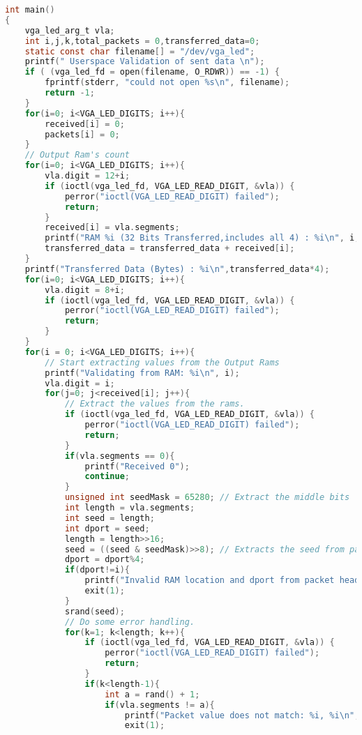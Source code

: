 \documentclass[twoside,12pt,fleqn]{book} %
\begin{document}
\begin{lstlisting}[language=C]
int main()
{
    vga_led_arg_t vla;
    int i,j,k,total_packets = 0,transferred_data=0;
    static const char filename[] = "/dev/vga_led";
    printf(" Userspace Validation of sent data \n");
    if ( (vga_led_fd = open(filename, O_RDWR)) == -1) {
        fprintf(stderr, "could not open %s\n", filename);
        return -1;
    }
    for(i=0; i<VGA_LED_DIGITS; i++){
        received[i] = 0;
        packets[i] = 0;
    }
    // Output Ram's count
    for(i=0; i<VGA_LED_DIGITS; i++){
        vla.digit = 12+i;
        if (ioctl(vga_led_fd, VGA_LED_READ_DIGIT, &vla)) {
            perror("ioctl(VGA_LED_READ_DIGIT) failed");
            return;
        }
        received[i] = vla.segments;
        printf("RAM %i (32 Bits Transferred,includes all 4) : %i\n", i, received[i]);
        transferred_data = transferred_data + received[i];
    }
    printf("Transferred Data (Bytes) : %i\n",transferred_data*4); 
    for(i=0; i<VGA_LED_DIGITS; i++){
        vla.digit = 8+i;
        if (ioctl(vga_led_fd, VGA_LED_READ_DIGIT, &vla)) {
            perror("ioctl(VGA_LED_READ_DIGIT) failed");
            return;
        }
    }
    for(i = 0; i<VGA_LED_DIGITS; i++){
        // Start extracting values from the Output Rams
        printf("Validating from RAM: %i\n", i);
        vla.digit = i;
        for(j=0; j<received[i]; j++){
            // Extract the values from the rams. 
            if (ioctl(vga_led_fd, VGA_LED_READ_DIGIT, &vla)) {
                perror("ioctl(VGA_LED_READ_DIGIT) failed");
                return;
            }
            if(vla.segments == 0){
                printf("Received 0");
                continue;
            }
            unsigned int seedMask = 65280; // Extract the middle bits
            int length = vla.segments;
            int seed = length;
            int dport = seed;
            length = length>>16;
            seed = ((seed & seedMask)>>8); // Extracts the seed from packet
            dport = dport%4;
            if(dport!=i){
                printf("Invalid RAM location and dport from packet header\n");
                exit(1);
            }
            srand(seed);
            // Do some error handling.
            for(k=1; k<length; k++){
                if (ioctl(vga_led_fd, VGA_LED_READ_DIGIT, &vla)) {
                    perror("ioctl(VGA_LED_READ_DIGIT) failed");
                    return;
                }
                if(k<length-1){
                    int a = rand() + 1;
                    if(vla.segments != a){
                        printf("Packet value does not match: %i, %i\n", a, vla.segments);
                        exit(1);

\end{lstlisting}
\end{document}
